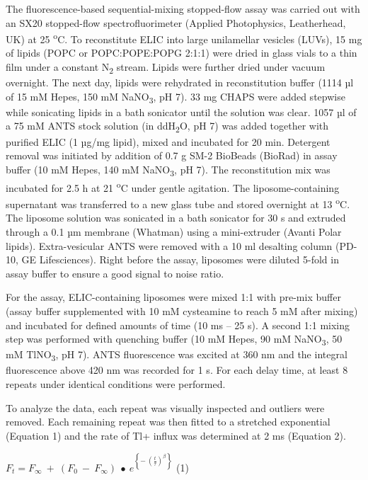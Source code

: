 The fluorescence-based sequential-mixing stopped-flow assay was carried
out with an SX20 stopped-flow spectrofluorimeter (Applied Photophysics,
Leatherhead, UK) at 25 \textsuperscript{o}C. To reconstitute ELIC into
large unilamellar vesicles (LUVs), 15 mg of lipids (POPC or
POPC:POPE:POPG 2:1:1) were dried in glass vials to a thin film under a
constant N\textsubscript{2} stream. Lipids were further dried under
vacuum overnight. The next day, lipids were rehydrated in reconstitution
buffer (1114 µl of 15 mM Hepes, 150 mM NaNO\textsubscript{3}, pH 7). 33
mg CHAPS were added stepwise while sonicating lipids in a bath sonicator
until the solution was clear. 1057 µl of a 75 mM ANTS stock solution (in
ddH\textsubscript{2}O, pH 7) was added together with purified ELIC (1
µg/mg lipid), mixed and incubated for 20 min. Detergent removal was
initiated by addition of 0.7 g SM-2 BioBeads (BioRad) in assay buffer
(10 mM Hepes, 140 mM NaNO\textsubscript{3}, pH 7). The reconstitution
mix was incubated for 2.5 h at 21 \textsuperscript{o}C under gentle
agitation. The liposome-containing supernatant was transferred to a new
glass tube and stored overnight at 13 \textsuperscript{o}C. The liposome
solution was sonicated in a bath sonicator for 30 s and extruded through
a 0.1 µm membrane (Whatman) using a mini-extruder (Avanti Polar lipids).
Extra-vesicular ANTS were removed with a 10 ml desalting column (PD-10,
GE Lifesciences). Right before the assay, liposomes were diluted 5-fold
in assay buffer to ensure a good signal to noise ratio.

For the assay, ELIC-containing liposomes were mixed 1:1 with pre-mix
buffer (assay buffer supplemented with 10 mM cysteamine to reach 5 mM
after mixing) and incubated for defined amounts of time (10 ms -- 25 s).
A second 1:1 mixing step was performed with quenching buffer (10 mM
Hepes, 90 mM NaNO\textsubscript{3}, 50 mM TlNO\textsubscript{3}, pH 7).
ANTS fluorescence was excited at 360 nm and the integral fluorescence
above 420 nm was recorded for 1 s. For each delay time, at least 8
repeats under identical conditions were performed.

To analyze the data, each repeat was visually inspected and outliers
were removed. Each remaining repeat was then fitted to a stretched
exponential (Equation 1) and the rate of Tl+ influx was determined at 2
ms (Equation 2).

\(F_{t} = F_{\infty}\  + \ \left( F_{0}\  - \ F_{\infty} \right)\  \bullet \ e^{\left\{ - \ \left( \frac{t}{\tau} \right)^{\beta} \right\}}\)
(1)

